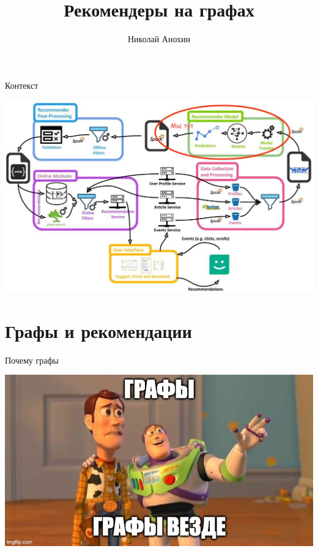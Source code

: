 \documentclass[11pt,aspectratio=169,handout]{beamer}
\author{Николай Анохин}
\title{Рекомендеры на графах}
\begin{document}
{

\begin{frame}
\titlepage
\end{frame}


}

\begin{frame}{Контекст}

\begin{center}
\includegraphics[scale=0.23]{images/mendeley.jpeg}
\end{center}

\end{frame}

\section{Графы и рекомендации}

\begin{frame}{Почему графы}

\begin{center}
\includegraphics[scale=0.4]{images/graphs.jpeg}
\end{center}

\end{frame}
\end{document}
